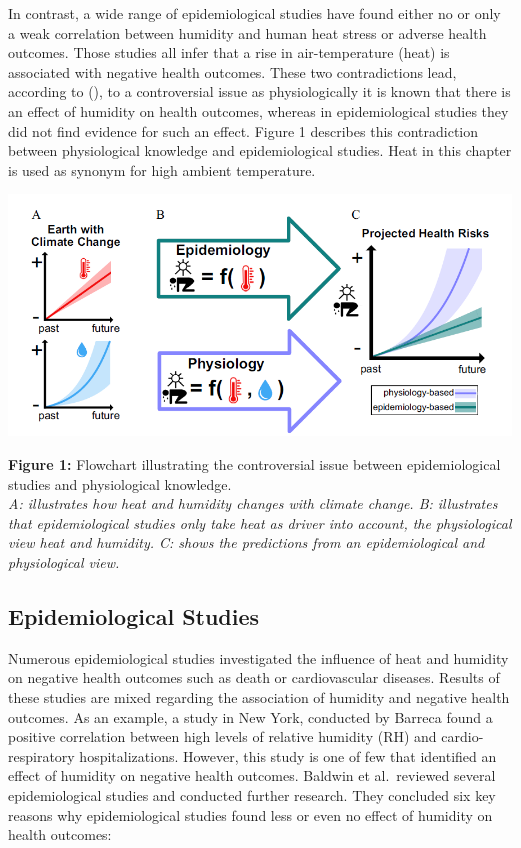 \documentclass[
]{krantz}
\begin{document}
In contrast, a wide range of epidemiological studies have found either no or only a weak correlation between humidity and human heat stress or adverse health outcomes. Those studies all infer that a rise in air-temperature (heat) is associated with negative health outcomes. These two contradictions lead, according to (\citet{bald}), to a controversial issue as physiologically it is known that there is an effect of humidity on health outcomes, whereas in epidemiological studies they did not find evidence for such an effect. Figure 1 describes this contradiction between physiological knowledge and epidemiological studies. Heat in this chapter is used as synonym for high ambient temperature.

\begin{center}\includegraphics[width=0.8\linewidth]{Controversial Issue} \end{center}

\textbf{Figure 1:} Flowchart illustrating the controversial issue between epidemiological studies and physiological knowledge.\\
\emph{A: illustrates how heat and humidity changes with climate change. B: illustrates that epidemiological studies only take heat as driver into account, the physiological view heat and humidity. C: shows the predictions from an epidemiological and physiological view.}

\subsection{Epidemiological Studies}\label{epidemiological-studies}

Numerous epidemiological studies investigated the influence of heat and humidity on negative health outcomes such as death or cardiovascular diseases. Results of these studies are mixed regarding the association of humidity and negative health outcomes. As an example, a study in New York, conducted by Barreca found a positive correlation between high levels of relative humidity (RH) and cardio-respiratory hospitalizations. However, this study is one of few that identified an effect of humidity on negative health outcomes.
Baldwin et al.~reviewed several epidemiological studies and conducted further research. They concluded six key reasons why epidemiological studies found less or even no effect of humidity on health outcomes:
\end{document}
